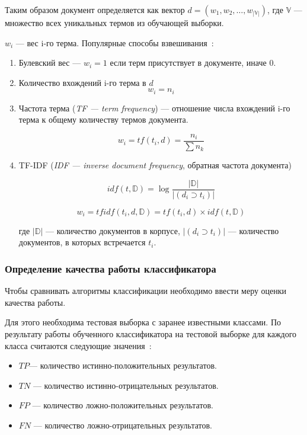 Таким образом документ определяется как вектор $d = (w_1, w_2, \ldots , w_{|\mathbb{V}|}) $,
где $\mathbb{V}$ --- множество всех уникальных термов из 
обучающей выборки. 

$w_i$ --- вес i-го терма. Популярные способы взвешивания~\cite{wiki_vectorspace}:
\begin{enumerate}

\item 
Булевский вес --- $w_i = 1$ если терм присутствует в документе, иначе 0.

\item
Количество вхождений i-го терма в $d$ 
\begin{equation} 
w_i = n_i
\end{equation}

\item
Частота терма (\textit{TF --- term frequency}) --- отношение числа вхождений i-го терма к общему количеству термов документа.

\begin{equation} 
w_i = tf(t_i, d) = \frac{n_i}{\sum n_k}
\end{equation}

\item
TF-IDF (\textit{IDF --- inverse document frequency}, обратная частота документа) 

\begin{equation} 
idf(t, \mathbb{D} ) = \log \frac{|\mathbb{D}|}{| (d_i \supset t_i) |}
\end{equation}

\begin{equation} 
w_i = tfidf(t_i, d, \mathbb{D} ) = tf(t_i, d) \times idf(t, \mathbb{D} )
\end{equation}

где $|\mathbb{D}|$ --- количество документов в корпусе, $| (d_i \supset t_i) |$ ---
количество документов, в которых встречается $t_i$.

\end{enumerate}


\subsubsection{Определение качества работы классификатора}

Чтобы сравнивать алгоритмы классификации необходимо 
ввести меру оценки качества работы.

Для этого необходима тестовая выборка с заранее известными классами.
По результату работы обученного классификатора на тестовой выборке
для каждого класса считаются следующие значения~\cite{classifier_performance}:
\begin{itemize}
\item $TP$--- количество истинно-положительных результатов.
\item $TN$ --- количество истинно-отрицательных результатов.
\item $FP$ --- количество ложно-положительных результатов.
\item $FN$ --- количество ложно-отрицательных результатов.
\end{itemize}

